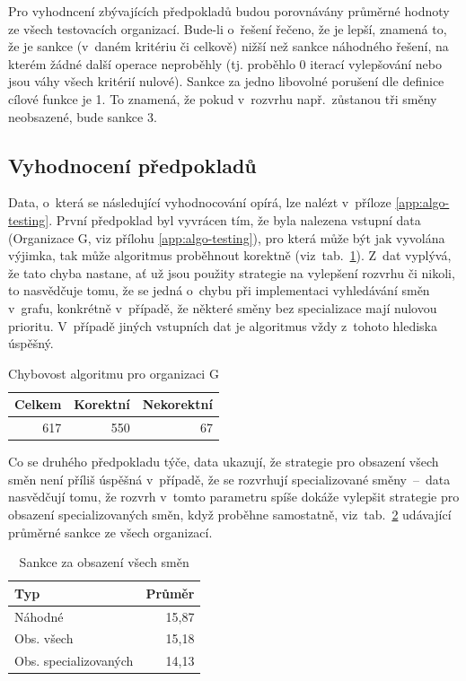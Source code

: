 \documentclass[twoside]{ctuthesis}
\begin{document}
Pro vyhodncení zbývajících předpokladů budou porovnávány průměrné hodnoty ze všech testovacích organizací. Bude-li o~řešení řečeno, že je lepší, znamená to, že je sankce (v~daném kritériu či celkově) nižší než sankce náhodného řešení, na kterém žádné další operace neproběhly (tj. proběhlo 0 iterací vylepšování nebo jsou váhy všech kritérií nulové). Sankce za jedno libovolné porušení dle definice cílové funkce je 1. To znamená, že pokud v~rozvrhu např.~zůstanou tři směny neobsazené, bude sankce 3.

\subsection{Vyhodnocení předpokladů}
Data, o~která se následující vyhodnocování opírá, lze nalézt v~příloze \ref{app:algo-testing}. První předpoklad byl vyvrácen tím, že byla nalezena vstupní data (Organizace G, viz přílohu \ref{app:algo-testing}), pro která může být jak vyvolána výjimka, tak může algoritmus proběhnout korektně (viz~tab.~\ref{tab:errors}). Z~dat vyplývá, že tato chyba nastane, ať už jsou použity strategie na vylepšení rozvrhu či nikoli, to nasvědčuje tomu, že se jedná o~chybu při implementaci vyhledávání směn v~grafu, konkrétně v~případě, že některé směny bez specializace mají nulovou prioritu. V~případě jiných vstupních dat je algoritmus vždy z~tohoto hlediska úspěšný.

\begin{table}[h]
	\caption{Chybovost algoritmu pro organizaci G}
	\label{tab:errors}
	\begin{tabular}{r|rr}
		\hline
		\textbf{Celkem} & \textbf{Korektní} & \textbf{Nekorektní}\\
		\hline
		\rowcolor{Gray}
		617 & 550 & 67\\
		\hline
	\end{tabular}
\end{table}

Co se druhého předpokladu týče, data ukazují, že strategie pro obsazení všech směn není příliš úspěšná v~případě, že se rozvrhují specializované směny~–~data nasvědčují tomu, že rozvrh v~tomto parametru spíše dokáže vylepšit strategie pro obsazení specializovaných směn, když proběhne samostatně, viz~tab.~\ref{tab:empty} udávající průměrné sankce ze všech organizací.

\begin{table}[h]
	\caption{Sankce za obsazení všech směn}
	\label{tab:empty}
	\begin{tabular}{lr}
		\hline
		\textbf{Typ} & \textbf{Průměr}\\
		\hline
		\rowcolor{Gray}
		Náhodné & 15,87\\
		Obs. všech & 15,18 \\
		\rowcolor{Gray}
		Obs. specializovaných & 14,13\\
		\hline
	\end{tabular}
\end{table}
\end{document}
